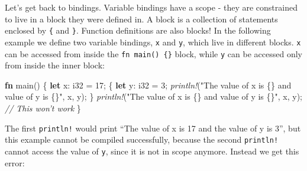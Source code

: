 \documentclass[a4paper,]{book}
\newenvironment{Shaded}{\begin{snugshade}}{\end{snugshade}}
\newcommand{\KeywordTok}[1]{\textcolor[rgb]{0.13,0.29,0.53}{\textbf{{#1}}}}
\newcommand{\DataTypeTok}[1]{\textcolor[rgb]{0.13,0.29,0.53}{{#1}}}
\newcommand{\DecValTok}[1]{\textcolor[rgb]{0.00,0.00,0.81}{{#1}}}
\newcommand{\StringTok}[1]{\textcolor[rgb]{0.31,0.60,0.02}{{#1}}}
\newcommand{\CommentTok}[1]{\textcolor[rgb]{0.56,0.35,0.01}{\textit{{#1}}}}
\newcommand{\PreprocessorTok}[1]{\textcolor[rgb]{0.56,0.35,0.01}{\textit{{#1}}}}
\newcommand{\NormalTok}[1]{{#1}}
\begin{document}
Let's get back to bindings. Variable bindings have a scope - they are
constrained to live in a block they were defined in. A block is a
collection of statements enclosed by \texttt{\{} and \texttt{\}}.
Function definitions are also blocks! In the following example we define
two variable bindings, \texttt{x} and \texttt{y}, which live in
different blocks. \texttt{x} can be accessed from inside the
\texttt{fn\ main()\ \{\}} block, while \texttt{y} can be accessed only
from inside the inner block:

\begin{Shaded}
\begin{Highlighting}[]
\KeywordTok{fn} \NormalTok{main() \{}
    \KeywordTok{let} \NormalTok{x: }\DataTypeTok{i32} \NormalTok{= }\DecValTok{17}\NormalTok{;}
    \NormalTok{\{}
        \KeywordTok{let} \NormalTok{y: }\DataTypeTok{i32} \NormalTok{= }\DecValTok{3}\NormalTok{;}
        \PreprocessorTok{println!}\NormalTok{(}\StringTok{"The value of x is \{\} and value of y is \{\}"}\NormalTok{, x, y);}
    \NormalTok{\}}
    \PreprocessorTok{println!}\NormalTok{(}\StringTok{"The value of x is \{\} and value of y is \{\}"}\NormalTok{, x, y); }\CommentTok{// This won't work}
\NormalTok{\}}
\end{Highlighting}
\end{Shaded}

The first \texttt{println!} would print ``The value of x is 17 and the
value of y is 3'', but this example cannot be compiled successfully,
because the second \texttt{println!} cannot access the value of
\texttt{y}, since it is not in scope anymore. Instead we get this error:

\begin{Shaded}
\end{Shaded}
\end{document}
